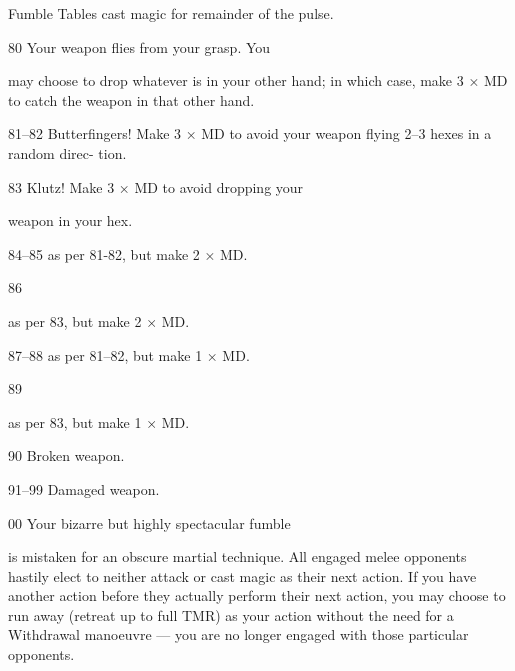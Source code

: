 \begin{Chapter}{Fumble Tables}
cast magic for remainder of the pulse. 

80   Your weapon flies from your grasp. You 

may choose to drop whatever is in your 
other hand; in which case, make 3 × MD to 
catch the weapon in that other hand. 

81–82  Butterfingers! Make 3 × MD to avoid your 
weapon flying 2–3 hexes in a random direc-
tion. 

83   Klutz! Make 3 × MD to avoid dropping your 

weapon in your hex. 

84–85  as per 81-82, but make 2 × MD. 

86  

as per 83, but make 2 × MD. 

87–88  as per 81–82, but make 1 × MD. 

89  

as per 83, but make 1 × MD. 

90   Broken weapon. 

91–99  Damaged weapon. 

00   Your bizarre but highly spectacular fumble 

is mistaken for an obscure martial technique. 
All engaged melee opponents hastily elect to 
neither attack or cast magic as their next 
action. If you have another action before 
they actually perform their next action, you 
may choose to run away (retreat up to full 
TMR) as your action without the need for a 
Withdrawal manoeuvre — you are no longer 
engaged with those particular opponents. 

\end{Chapter}

